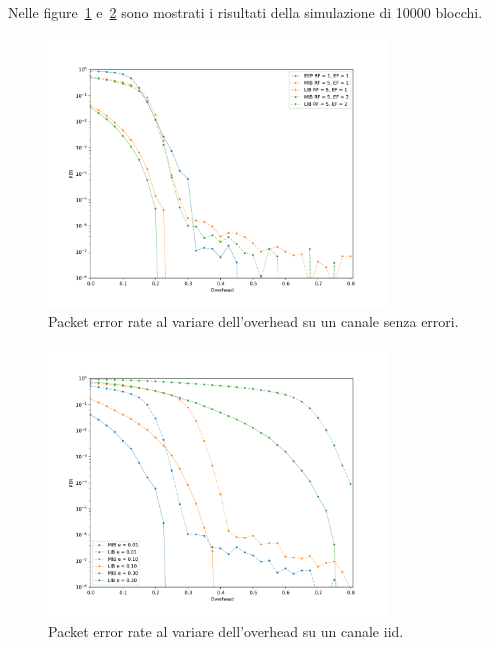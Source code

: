 \documentclass[italian, a4paper, 12pt]{article}
\begin{document}
Nelle figure~\ref{fig:zero_oh} e~\ref{fig:iid_oh} sono mostrati i
risultati della simulazione di 10000 blocchi.
%
\begin{figure}[H]
  \centering
  \includegraphics[width=0.8\textwidth]{plot_ber_zero_oh}
  \caption{Packet error rate al variare dell'overhead su un canale
    senza errori.}
  \label{fig:zero_oh}
\end{figure}
%
\begin{figure}[H]
  \centering
  \includegraphics[width=0.8\textwidth]{plot_ber_iid}
  \caption{Packet error rate al variare dell'overhead su un canale
    iid.}
  \label{fig:iid_oh}
\end{figure}

%
%
\end{document}
